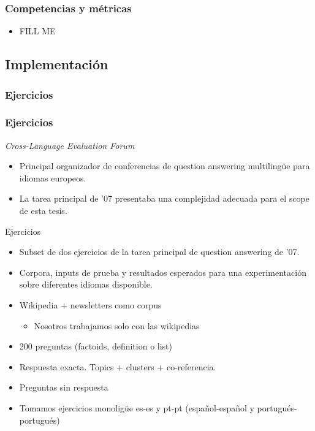 \begin{frame}
\frametitle{Competencias y métricas}
\begin{itemize}
\item {\color{red}FILL ME}
\end{itemize}
\end{frame}


\subsection{Implementación}

\subsubsection*{Ejercicios}

\begin{frame}
\frametitle{Ejercicios}
  \textit{Cross-Language Evaluation Forum}
  \begin{itemize}
    \item Principal organizador de conferencias de question answering multilingüe para idiomas europeos.
    \item La tarea principal de '07 presentaba una complejidad adecuada para el scope de esta tesis.
  \end{itemize}
  Ejercicios
  \begin{itemize}
    \item Subset de dos ejercicios de la tarea principal de question answering de '07. 
    \item Corpora, inputs de prueba y resultados esperados para una experimentación sobre diferentes idiomas disponible.
    \item Wikipedia + newsletters como corpus
    \begin{itemize}
      \item Nosotros trabajamos solo con las wikipedias
    \end{itemize}
    \item 200 preguntas (factoids, definition o list)
    \item Respuesta exacta. Topics + clusters + co-referencia.
    \item Preguntas sin respuesta
    \item Tomamos ejercicios monoligüe es-es y pt-pt (español-español y portugués-portugués)
  \end{itemize}
\end{frame}


